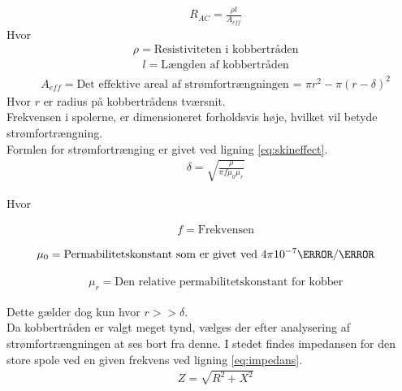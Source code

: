 \begin{align}
	& R_{AC}=\frac{\rho l}{A_{eff}} \label{eq:R_AC}
\end{align}
Hvor
\begin{align}
	& \rho = \text{Resistiviteten i kobbertråden} \nonumber
\end{align}
\begin{align}
	& l = \text{Længden af kobbertråden} \nonumber
\end{align}
\begin{align}
	& A_{eff} = \text{Det effektive areal af strømfortrængningen = $\pi r^2-\pi(r-\delta)^2$} \nonumber
\end{align}
Hvor $r$ er radius på kobbertrådens tværsnit.\\	
Frekvensen i spolerne, er dimensioneret forholdsvis høje, hvilket vil betyde strømfortrængning.  \\
Formlen for strømfortrænging er givet ved ligning \ref{eq:skineffect}.
\begin{align}
	& \delta = \sqrt{\frac{\rho}{\pi f\mu_0\mu_r}} \label{eq:skineffect}
\end{align}

Hvor 



\begin{align}
	& f = \text{Frekvensen} \nonumber
\end{align}

\begin{align}
	& \mu_0 = \text{Permabilitetskonstant som er givet ved $4\pi 10^{-7}\henry/\meter$} \nonumber
\end{align}

\begin{align}
	& \mu_r = \text{Den relative permabilitetskonstant for kobber} \nonumber
\end{align}


Dette gælder dog kun hvor $r>>\delta$. \\
Da kobbertråden er valgt meget tynd, vælges der efter analysering af strømfortrængningen at ses bort fra denne. 
I stedet findes impedansen for den store spole ved en given frekvens ved ligning \ref{eq:impedans}.
\begin{align}
	& Z=\sqrt{R^2+X^2} \label{eq:impedans}
\end{align}

